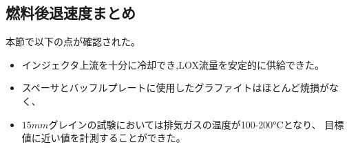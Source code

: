 \subsection{燃料後退速度まとめ}
本節で以下の点が確認された。
\begin{itemize}
\item インジェクタ上流を十分に冷却でき,LOX流量を安定的に供給できた。
\item スペーサとバッフルプレートに使用したグラファイトはほとんど焼損がなく、
\item $15mm$グレインの試験においては排気ガスの温度が100-200°Cとなり、
目標値に近い値を計測することができた。
\end{itemize}

